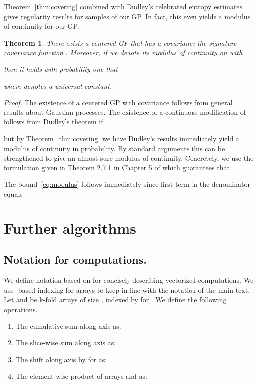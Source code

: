 \documentclass{article}
\newtheorem{theorem}{Theorem}
\begin{document}
Theorem~\ref{thm:covering} combined with Dudley's celebrated entropy estimates gives regularity results for samples of our GP.
In fact, this even yields a modulus of continuity for our GP.
\begin{theorem}
  There exists a centered GP  that has a covariance  the signature covariance function .
  Moreover, if we denote its modulus of continuity on  with 
  
  then it holds with probability one that 
  
  where  denotes a universal constant.
\end{theorem}
\begin{proof}
The existence of a centered GP  with covariance  follows from general results about Gaussian processes. 
The existence of a continuous modification  of follows from Dudley's theorem if 
 
 but by Theorem~\ref{thm:covering} we have 
 Dudley's results immediately yield a modulus of continuity in probability.
 By standard arguments this can be strengthened to give an almost sure modulus of continuity. 
 Concretely, we use the formulation given in Theorem 2.7.1 in Chapter 5 of \cite{khoshnevisan2002multiparameter} which guarantees that
 
The bound~\eqref{eq:modulus} follows immediately since first term in the denominator equals 
 
\end{proof}

\section{Further algorithms}\label{app:algos}
  \subsection{Notation for computations.} \label{app:alg_notation}
  We define notation based on \cite{KiralyOberhauser2019KSig} for concisely describing vectorized computations. We use -based indexing for arrays to keep in line with the notation of the main text. Let  and  be k-fold arrays of size , indexed by  for . We define the following operations.
  \begin{enumerate}[label=(\roman*)]
  	\item  The cumulative sum along axis  as:
  	
  	\item The slice-wise sum along axis  as:
  	
  	\item The shift along axis  by  for  as:
  	
  	\item The element-wise product of arrays  and  as:
  	 
  \end{enumerate}
\end{document}

